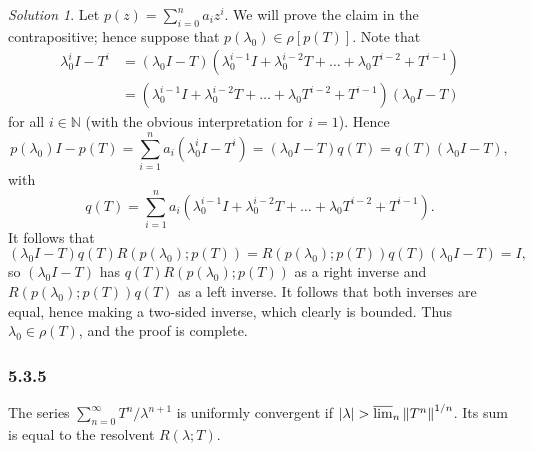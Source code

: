 \documentclass{report}
\newcommand{\bb}[1]{\mathbb{#1}}
\newcommand{\norm}[1]{{\lVert #1 \rVert}}
\theoremstyle{remark}
\newtheorem*{solution}{Solution}
\begin{document}
\begin{solution}
  Let $p(z) = \sum_{i=0}^n a_i z^i$. We will prove the claim in the contrapositive; hence suppose that $p(\lambda_0) \in \rho[p(T)]$. Note that
  \begin{equation*}
    \begin{split}
      \lambda_0^i I - T^i &= (\lambda_0 I - T)(\lambda_0^{i-1} I + \lambda_0^{i-2} T + \dots + \lambda_0 T^{i-2} + T^{i-1}) \\
      &= (\lambda_0^{i-1} I + \lambda_0^{i-2} T + \dots + \lambda_0 T^{i-2} + T^{i-1})(\lambda_0 I - T)
    \end{split}
  \end{equation*}
  for all $i \in \bb N$ (with the obvious interpretation for $i = 1$). Hence
  \begin{equation*}
    p(\lambda_0) I - p(T) = \sum_{i=1}^n a_i (\lambda_0^i I - T^i) = (\lambda_0 I - T)q(T) = q(T)(\lambda_0 I - T),
  \end{equation*}
  with
  \begin{equation*}
    q(T) = \sum_{i=1}^n a_i (\lambda_0^{i-1} I + \lambda_0^{i-2} T + \dots + \lambda_0 T^{i-2} + T^{i-1}).
  \end{equation*}
  It follows that
  \begin{equation*}
    (\lambda_0 I - T) q(T) R(p(\lambda_0); p(T)) = R(p(\lambda_0); p(T)) q(T) (\lambda_0 I - T) = I,
  \end{equation*}
  so $(\lambda_0 I - T)$ has $q(T) R(p(\lambda_0); p(T))$ as a right inverse and $R(p(\lambda_0); p(T)) q(T)$ as a left inverse. It follows that both inverses are equal, hence making a two-sided inverse, which clearly is bounded. Thus $\lambda_0 \in \rho(T)$, and the proof is complete.
\end{solution}

\subsubsection*{5.3.5}
The series $\sum_{n=0}^\infty T^n/\lambda^{n+1}$ is uniformly convergent if $|\lambda| > \varlimsup_n \norm{T^n}^{1/n}$. Its sum is equal to the resolvent $R(\lambda; T)$.
\end{document}
